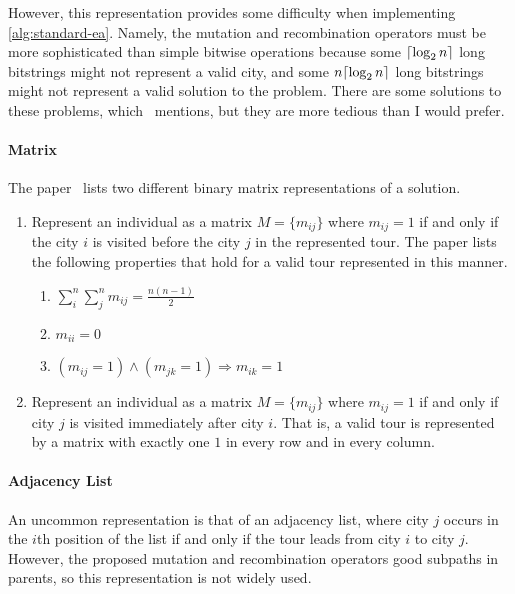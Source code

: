 \documentclass{article}
\begin{document}
However, this representation provides some difficulty when implementing \autoref{alg:standard-ea}.
Namely, the mutation and recombination operators must be more sophisticated than simple bitwise
operations because some $\ceil*{\log_2 n}$ long bitstrings might not represent a valid city, and
some $n\ceil*{\log_2 n}$ long bitstrings might not represent a valid solution to the problem. There
are some solutions to these problems, which~\cite{tsp_ea} mentions, but they are more tedious than
I would prefer.

\paragraph{Matrix}
The paper~\cite{tsp_ea} lists two different binary matrix representations of a solution.
\begin{enumerate}
    \item Represent an individual as a matrix $M = \{m_{ij}\}$ where $m_{ij} = 1$ if and only if
          the city $i$ is visited before the city $j$ in the represented tour. The paper lists the
          following properties that hold for a valid tour represented in this manner.
          \begin{enumerate}
              \item $\displaystyle \sum_i^n \sum_j^n m_{ij} = \frac{n(n - 1)}{2}$
              \item $\displaystyle m_{ii} = 0$
              \item $\displaystyle (m_{ij} = 1) \wedge (m_{jk} = 1) \Rightarrow m_{ik} = 1$
          \end{enumerate}
    \item Represent an individual as a matrix $M = \{m_{ij}\}$ where $m_{ij} = 1$ if and only if
          city $j$ is visited immediately after city $i$. That is, a valid tour is represented by a
          matrix with exactly one $1$ in every row and in every column.
\end{enumerate}

\paragraph{Adjacency List}
An uncommon representation is that of an adjacency list, where city $j$ occurs in the $i$th
position of the list if and only if the tour leads from city $i$ to city $j$. However, the proposed
mutation and recombination operators good subpaths in parents, so this representation is not widely
used.
\end{document}
